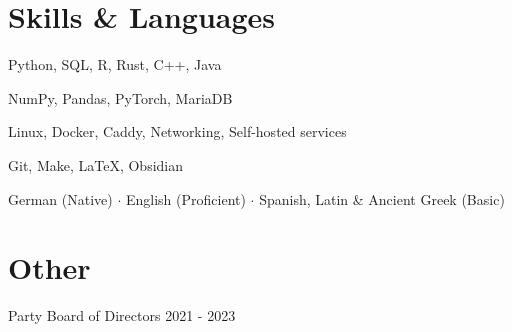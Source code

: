 \documentclass[11pt]{article}
\begin{document}
\section{Skills \& Languages}
\begin{description}[itemsep=0pt]
	\item[Programming] Python, SQL, R, Rust, C++, Java
	\item[Data \& ML] NumPy, Pandas, PyTorch, MariaDB
	\item[Infrastructure] Linux, Docker, Caddy, Networking, Self-hosted services
	\item[Tools] Git, Make, \LaTeX, Obsidian
	\item[Languages] German (Native) $\cdot$ English (Proficient) $\cdot$ Spanish, Latin \& Ancient Greek (Basic)
\end{description}

\section{Other}
\begin{description}[itemsep=0pt]
	\item[Die PARTEI] Party Board of Directors \hfill 2021 - 2023
\end{description}
\end{document}
